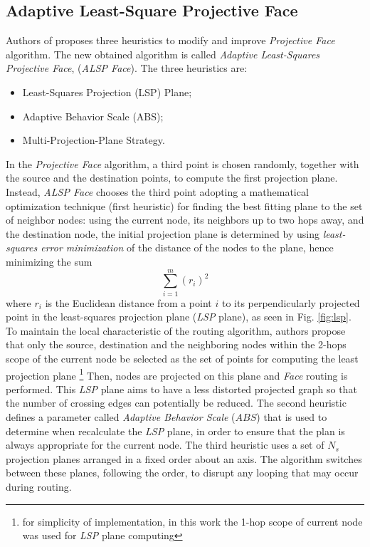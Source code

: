 \documentclass[journal,comsoc]{IEEEtran}
\begin{document}
\subsection{Adaptive Least-Square Projective Face}
Authors of \cite{kao:nearly} proposes three heuristics to modify and improve \emph{Projective Face} algorithm. The new obtained algorithm is called \emph{Adaptive Least-Squares Projective Face}, (\emph{ALSP Face}). The three heuristics are:
\begin{itemize}
\item Least-Squares Projection (LSP) Plane;
\item Adaptive Behavior Scale (ABS);
\item Multi-Projection-Plane Strategy.
\end{itemize}
 In the \emph{Projective Face} algorithm, a third point is chosen randomly, together with the source and the destination points, to compute the first projection plane. Instead, \emph{ALSP Face} chooses the third point adopting a mathematical optimization technique (first heuristic) for finding the best fitting plane to the set of neighbor nodes: using the current node, its neighbors up to two hops away, and the destination node, the initial projection plane is determined by using \emph{least-squares error minimization} of the distance of the nodes to the plane, hence minimizing the sum 
   \[  \sum^{m}_{i=1}(r_i)^2  \]
where \(r_i\) is the Euclidean distance from a point \(i\) to its perpendicularly projected point in the least-squares projection plane (\emph{LSP} plane), as seen in Fig. \ref{fig:lsp}. To maintain the local characteristic of the routing algorithm, authors propose that only the source, destination and the neighboring nodes within the 2-hops scope of the current node be selected as the set of points for computing the least projection plane \footnote{for simplicity of implementation, in this work the 1-hop scope of current node was used for \emph{LSP} plane computing} Then, nodes are projected on this plane and \emph{Face} routing is performed. This \emph{LSP} plane aims to have a less distorted projected graph so that the number of crossing edges can potentially be reduced. The second heuristic defines a parameter called \emph{Adaptive Behavior Scale} (\(ABS\)) that is used to determine when recalculate the \emph{LSP} plane, in order to ensure that the plan is always appropriate for the current node. The third heuristic uses a set of \(N_s\) projection planes arranged in a fixed order about an axis. The algorithm switches between these planes, following the order, to disrupt any looping that may occur during routing.
\end{document}
